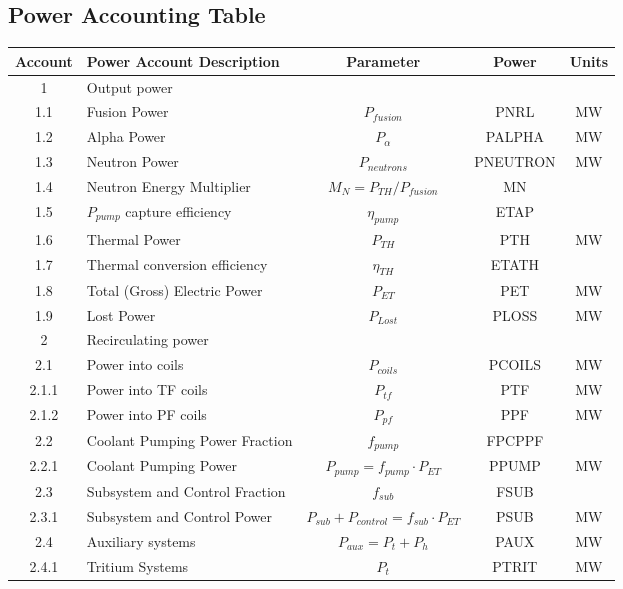 \newpage
\subsection{Power Accounting Table}

\begin{table}[ht!]								
\centering								
\begin{tabular}{|c|p{5cm}|c|c|c|}								
\hline								
\textbf{Account}	&	\textbf{Power Account Description}	&	\textbf{Parameter }	&	\textbf{Power}	&	\textbf{Units} \\
\hline								
1	&	Output power	&		&		&	\\
\hline
1.1	&	Fusion Power	&	$P_{{fusion}}$	&	PNRL	&	MW \\
1.2	&	Alpha Power	&	$P_{{\alpha}}$	&	PALPHA	&	MW \\
1.3	&	Neutron Power	&	$P_{{neutrons}}$	&	PNEUTRON	&	MW \\
1.4	&	Neutron Energy Multiplier	&	$M_N = P_{{TH}}/P_{{fusion}}$	&	MN	&	\\
1.5	&	$P_{pump}$ capture efficiency	&	$\eta_{{pump}}$	&	ETAP	&	\\
1.6	&	Thermal Power	&	$P_{{TH}}$	&	PTH	&	MW \\
1.7	&	Thermal conversion efficiency	&	$\eta_{{TH}}$	&	ETATH	&	\\
1.8	&	Total (Gross) Electric Power	&	$P_{{ET}}$	&	PET	&	MW \\
1.9	&	Lost Power	&	$P_{{Lost}}$	&	PLOSS	&	MW \\
\hline								
2	&	Recirculating power	&		&		&	\\
\hline
2.1	&	Power into coils 	&	$P_{coils}$ &	PCOILS	&	MW \\
2.1.1	&	Power into TF coils	&	$P_{tf}$	&	PTF	&	MW \\
2.1.2	&	Power into PF coils	&	$P_{pf}$	&	PPF		&	MW \\
2.2	&	Coolant Pumping Power Fraction	&	$f_{{pump}}$	&	FPCPPF &	\\
2.2.1	&	Coolant Pumping Power	&	$P_{{pump}} = f_{{pump}} \cdot P_{{ET}}$	&	PPUMP	&	MW \\
2.3	&	Subsystem and Control Fraction	&	$f_{{sub}}$	&	FSUB	&	\\
2.3.1	&	Subsystem and Control Power	&	$P_{{sub}} + P_{{control}} = f_{{sub}} \cdot P_{{ET}}$	&	PSUB	&	MW \\
2.4	&	Auxiliary systems	&	$P_{{aux}} = P_{{t}} + P_{{h}}$	&	PAUX	&	MW \\
2.4.1	&	Tritium Systems	&	$P_{{t}}$	&	PTRIT	&	MW \\

\end{tabular}
\end{table}
